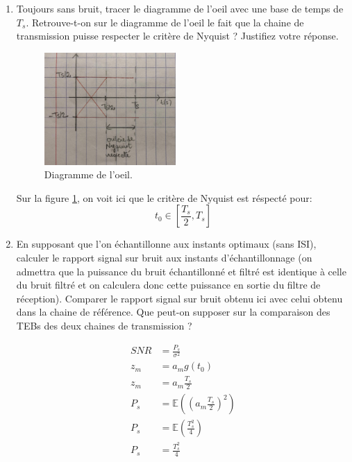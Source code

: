 \documentclass[frenchb]{article}
\begin{document}
\begin{enumerate}
        \item Toujours sans bruit, tracer le diagramme de l'oeil avec une base de temps de $T_s$. Retrouve-t-on sur le diagramme de l'oeil le fait que la chaine de transmission puisse respecter le critère de Nyquist ? Justifiez votre réponse.
        
        \begin{figure}[ht!]
		\centering
		\includegraphics[width=5cm]{C2Q3.jpg}		\caption{Diagramme de l'oeil. \label{fig : C2Q3}}
		\end{figure}

        \par\leavevmode\par
        \setlength\parindent{0.5cm}
        Sur la figure \ref{fig : C2Q3}, on voit ici que le critère de Nyquist est réspecté pour:
        $$\boxed{t_0 \in \left[\frac{T_s}{2}, T_s\right]}$$
         \par\leavevmode\par
        \item En supposant que l'on échantillonne aux instants optimaux (sans ISI), calculer le rapport signal sur bruit aux instants d'échantillonnage (on admettra que la puissance du bruit échantillonné et filtré est identique à celle du bruit filtré et on calculera donc cette puissance en sortie du filtre de réception). Comparer le rapport signal sur bruit obtenu ici avec celui obtenu dans la chaine de référence. Que peut-on supposer sur la comparaison des TEBs des deux chaines de transmission ?
        
        \begin{equation*}
        \begin{split}
        SNR & = \frac{P_s}{\sigma^2} \\        
        z_m &= a_m g(t_0)\\
        z_m & = a_m \frac{T_s}{2}\\
        P_s & = \mathbb{E}\left(\left(a_m \frac{T_s}{2}\right)^2\right) \\
        P_s & = \mathbb{E}\left(\frac{T_s^2}{4}\right) \\
        P_s & = \frac{T_s^2}{4}
        \end{split}
        \end{equation*}
         

\end{enumerate}
\end{document}
